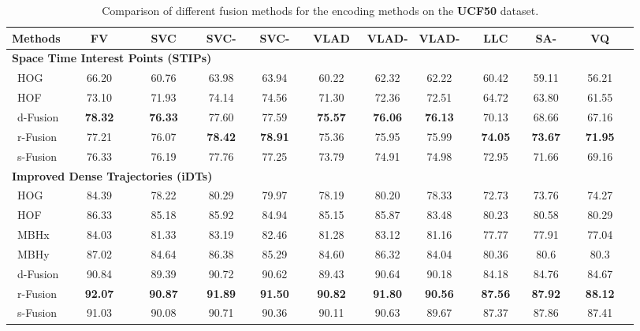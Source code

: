 \documentclass[twocolumn]{svjour3}          \smartqed  \usepackage{slashbox}
\begin{document}
\begin{table*}
  \caption{Comparison of different fusion methods for the encoding methods on the \textbf{UCF50} dataset.}
  \label{tbl:ucf50}
  \centering
  \begin{tabular}{lcccccccccc}
  \hline
  \hline
  Methods & ~~~FV~~~ & ~~SVC~~ & ~SVC-~ & ~SVC-~ & ~VLAD~ & VLAD- & VLAD- & ~~LLC~~ & SA- & ~~~VQ~~~ \\
  \hline
  \hline
  \multicolumn{11}{l}{\textbf{Space Time Interest Points (STIPs)}} \\
  ~HOG & 66.20 & 60.76 & 63.98 & 63.94 & 60.22 & 62.32 & 62.22 & 60.42 & 59.11 & 56.21 \\
  ~HOF & 73.10 & 71.93 & 74.14 & 74.56 & 71.30 & 72.36 & 72.51 & 64.72 & 63.80 & 61.55\\
  ~d-Fusion & \textbf{78.32} & \textbf{76.33} & 77.60 & 77.59 & \textbf{75.57} & \textbf{76.06} & \textbf{76.13} & 70.13 & 68.66 & 67.16 \\
  ~r-Fusion & 77.21 & 76.07 & \textbf{78.42} & \textbf{78.91} & 75.36 & 75.95 & 75.99 & \textbf{74.05} & \textbf{73.67} & \textbf{71.95} \\
  ~s-Fusion & 76.33 & 76.19 & 77.76 & 77.25 & 73.79 & 74.91 & 74.98 & 72.95 & 71.66 & 69.16 \\
  \hline
  \multicolumn{11}{l}{\textbf{Improved Dense Trajectories (iDTs)}} \\
  ~HOG & 84.39 & 78.22 & 80.29 & 79.97 & 78.19 & 80.20 & 78.33 & 72.73 & 73.76 & 74.27 \\
  ~HOF & 86.33 & 85.18 & 85.92 & 84.94 & 85.15 & 85.87 & 83.48 & 80.23 & 80.58 & 80.29 \\
  ~MBHx & 84.03 & 81.33 & 83.19 & 82.46 & 81.28 & 83.12 & 81.16 & 77.77 & 77.91 & 77.04 \\
  ~MBHy & 87.02 & 84.64 & 86.38 & 85.29 & 84.60 & 86.32 & 84.04 & 80.36 & 80.6 & 80.3 \\
  ~d-Fusion & 90.84 & 89.39 & 90.72 & 90.62 & 89.43 & 90.64 & 90.18 & 84.18 & 84.76 & 84.67 \\
  ~r-Fusion & \textbf{92.07} & \textbf{90.87} & \textbf{91.89} & \textbf{91.50} & \textbf{90.82} & \textbf{91.80} & \textbf{90.56} & \textbf{87.56} & \textbf{87.92}  & \textbf{88.12} \\
  ~s-Fusion &  91.03 &  90.08 & 90.71 & 90.36 & 90.11 & 90.63 &  89.67 &   87.37 & 87.86 & 87.41 \\
  \hline
  \hline
  \end{tabular}
\end{table*}
\end{document}
